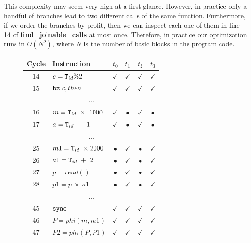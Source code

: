\documentclass[times,10pt,twocolumn]{article}
\newcommand{\tid}{\mbox{\texttt{T}}_{id}}
\newcommand{\code}[1]{\mbox{\texttt{#1}}}
\begin{document}
This complexity may seem very high at a first glance.
However, in practice only a handful of branches lead to two different
calls of the same function.
Furthermore, if we order the branches by profit, then we can inspect each one of
them in line 14 of \textbf{find\_joinable\_calls} at most once.
Therefore, in practice our optimization runs in $O(N^2)$, where $N$ is the 
number of basic blocks in the program code.

\begin{figure}[htb]
\begin{center}
\begin{small}
\begin{tabular}{|c|l|c|c|c|c|} \hline
Cycle   & Instruction                  & $t_0$        & $t_1$        & $t_2$        & $t_3$        \\ \hline
14      & $ c = \tid \% 2$             & $\checkmark$ & $\checkmark$ & $\checkmark$ & $\checkmark$ \\ \hline
15      & $ \code{bz} \ c, then$ & $\checkmark$ & $\checkmark$ & $\checkmark$ & $\checkmark$ \\ \hline
\multicolumn{6}{c}{$\ldots$} \\ \hline
16      & $ m = \tid \ \times \ 1000$        & $\checkmark$    & $\bullet$ & $\checkmark$ & $\bullet$ \\ \hline
17      & $ a = \tid \ + \ 1$ & $\checkmark$    & $\bullet$ & $\checkmark$ & $\bullet$ \\ \hline
\multicolumn{6}{c}{$\ldots$} \\ \hline
25      & $ m1 = \tid \ \times 2000$ & $\bullet$    & $\checkmark$ & $\bullet$ & $\checkmark$ \\ \hline
26      & $ a1 = \tid \ + \ 2$        & $\bullet$    & $\checkmark$    & $\bullet$ & $\checkmark$ \\ \hline
27      & $ p = read()$ & $\bullet$    & $\checkmark$    & $\bullet$ & $\checkmark$ \\ \hline
28      & $ p1 = p \ \times \ a1$ & $\bullet$    & $\checkmark$    & $\bullet$ & $\checkmark$ \\ \hline
\multicolumn{6}{c}{$\ldots$} \\ \hline
45      & $ \code{sync}$        & $\checkmark$ & $\checkmark$ & $\checkmark$ & $\checkmark$ \\ \hline
46      & $ P = phi(m, m1)$    & $\checkmark$ & $\checkmark$ & $\checkmark$ & $\checkmark$ \\ \hline
47      & $ P2 = phi(P, P1)$ & $\checkmark$    & $\checkmark$ & $\checkmark$ & $\checkmark$ \\ \hline

\end{tabular}
\end{small}
\end{center}
\end{figure}
\end{document}
